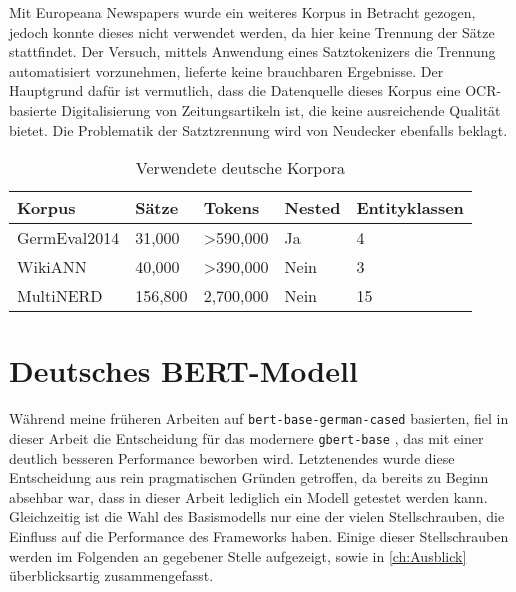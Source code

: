 Mit Europeana Newspapers \parencite{europeana} wurde ein weiteres Korpus in Betracht gezogen, jedoch konnte dieses nicht verwendet werden, da hier keine Trennung der Sätze stattfindet. Der Versuch, mittels Anwendung eines Satztokenizers die Trennung automatisiert vorzunehmen, lieferte keine brauchbaren Ergebnisse. Der Hauptgrund dafür ist vermutlich, dass die Datenquelle dieses Korpus eine OCR-basierte Digitalisierung von Zeitungsartikeln ist, die keine ausreichende Qualität bietet. Die Problematik der Satztzrennung wird von Neudecker ebenfalls beklagt.

\begin{table}[!htbp]
	\centering
	\caption{Verwendete deutsche Korpora}
	\label{tab:korpora}
	\begin{tabular}{@{}lllll@{}}
		\toprule
		\textbf{Korpus}   & \textbf{Sätze} & \textbf{Tokens}       & \textbf{Nested} & \textbf{Entityklassen} \\ \midrule
		GermEval2014    & 31,000         & \textgreater{}590,000 & Ja              & 4                       \\
		WikiANN         & 40,000         & \textgreater{}390,000 & Nein            & 3                       \\
		MultiNERD\footnotemark       & 156,800        & 2,700,000             & Nein            & 15                      \\ \bottomrule
		\end{tabular}
\end{table}

\section{Deutsches BERT-Modell}
\label{ch:Training:sec:DeutschBERT}

Während meine früheren Arbeiten auf \verb|bert-base-german-cased| \parencite{bert-base-german-cased} basierten, fiel in dieser Arbeit die Entscheidung für das modernere \verb|gbert-base| \parencite{gbert}, das mit einer deutlich besseren Performance beworben wird. Letztenendes wurde diese Entscheidung aus rein pragmatischen Gründen getroffen, da bereits zu Beginn absehbar war, dass in dieser Arbeit lediglich ein Modell getestet werden kann. Gleichzeitig ist die Wahl des Basismodells nur eine der vielen Stellschrauben, die Einfluss auf die Performance des Frameworks haben. Einige dieser Stellschrauben werden im Folgenden an gegebener Stelle aufgezeigt, sowie in \autoref{ch:Ausblick} überblicksartig zusammengefasst.


